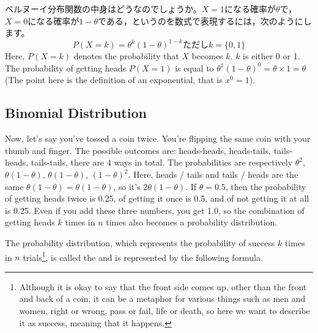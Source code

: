\documentclass{ltjbook}
\begin{document}
ベルヌーイ分布関数の中身はどうなのでしょうか。$X=1$になる確率が$\theta$で，$X=0$になる確率が$1-\theta$である，というのを数式で表現するには，次のようにします。
\[  P(X=k) = \theta^k(1-\theta)^{1-k} \mbox{ただし$k=\{0,1\}$} \]
Here, $P(X=k)$ denotes the probability that $X$ becomes $k$. $k$ is either 0 or 1. The probability of getting heads $P(X=1)$ is equal to $\theta^1(1-\theta)^0=\theta \times 1=\theta$ (The point here is the definition of an exponential, that is $x^0=1$).

\subsection{Binomial Distribution}
Now, let's say you've tossed a coin twice. You're flipping the same coin with your thumb and finger.
The possible outcomes are: heads-heads, heads-tails, tails-heads, tails-tails, there are 4 ways in total.
The probabilities are respectively $\theta^2$, $\theta(1-\theta)$, $\theta(1-\theta)$, $(1-\theta)^2$. Here, heads / tails and tails / heads are the same $\theta(1-\theta) = \theta(1-\theta)$, so it's $2\theta(1-\theta)$. If $\theta=0.5$, then the probability of getting heads twice is 0.25, of getting it once is 0.5, and of not getting it at all is 0.25. Even if you add these three numbers, you get 1.0, so the combination of getting heads $k$ times in $n$ times also becomes a probability distribution.

The probability distribution, which represents the probability of success $k$ times in $n$ trials\footnote{Although it is okay to say that the front side comes up, other than the front and back of a coin, it can be a metaphor for various things such as men and women, right or wrong, pass or fail, life or death, so here we want to describe it as success, meaning that it happens.}, is called the  and is represented by the following formula.
\end{document}
